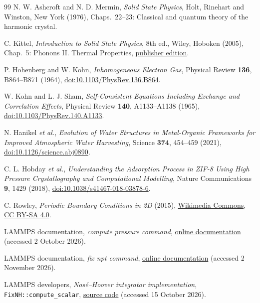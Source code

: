 \documentclass[12pt,a4paper]{article}
\numberwithin{equation}{section}
\begin{document}
\begin{thebibliography}{99}
N. W. Ashcroft and N. D. Mermin,
\emph{Solid State Physics}, Holt, Rinehart and Winston, New York (1976),
Chaps.~22--23: Classical and quantum theory of the harmonic crystal.

C. Kittel,
\emph{Introduction to Solid State Physics}, 8th ed., Wiley, Hoboken (2005),
Chap.~5: Phonons II. Thermal Properties,
\href{https://www.wiley.com/en-us/Introduction+to+Solid+State+Physics-p-9780471415268}{publisher edition}.

P. Hohenberg and W. Kohn,
\emph{Inhomogeneous Electron Gas}, Physical Review \textbf{136}, B864--B871
(1964),
\href{https://doi.org/10.1103/PhysRev.136.B864}{doi:10.1103/PhysRev.136.B864}.

W. Kohn and L. J. Sham,
\emph{Self-Consistent Equations Including Exchange and Correlation Effects},
Physical Review \textbf{140}, A1133--A1138 (1965),
\href{https://doi.org/10.1103/PhysRev.140.A1133}{doi:10.1103/PhysRev.140.A1133}.

N. Hanikel \emph{et al.},
\emph{Evolution of Water Structures in Metal-Organic Frameworks for Improved
Atmospheric Water Harvesting}, Science \textbf{374}, 454--459 (2021),
\href{https://doi.org/10.1126/science.abj0890}{doi:10.1126/science.abj0890}.

C. L. Hobday \emph{et al.},
\emph{Understanding the Adsorption Process in ZIF-8 Using High Pressure
Crystallography and Computational Modelling}, Nature Communications
\textbf{9}, 1429 (2018),
\href{https://doi.org/10.1038/s41467-018-03878-6}{doi:10.1038/s41467-018-03878-6}.

C. Rowley, \emph{Periodic Boundary Conditions in 2D} (2015),
\href{https://commons.wikimedia.org/wiki/File:Periodic_Boundary_Conditions_in_2D.png}{Wikimedia Commons},
\href{https://creativecommons.org/licenses/by-sa/4.0/}{CC BY-SA 4.0}.

LAMMPS documentation,
\emph{compute pressure command},
\href{https://docs.lammps.org/compute_pressure.html}{online documentation}
(accessed 2 October 2026).

LAMMPS documentation, \emph{fix npt command},
\href{https://docs.lammps.org/fix_nh.html}{online documentation}
(accessed 2 November 2026).

LAMMPS developers, \emph{Nos\'e--Hoover integrator implementation},
\texttt{FixNH::compute\_scalar},
\href{https://github.com/lammps/lammps/blob/develop/src/fix_nh.cpp}{source code}
(accessed 15 October 2026).


\end{thebibliography}
\end{document}
